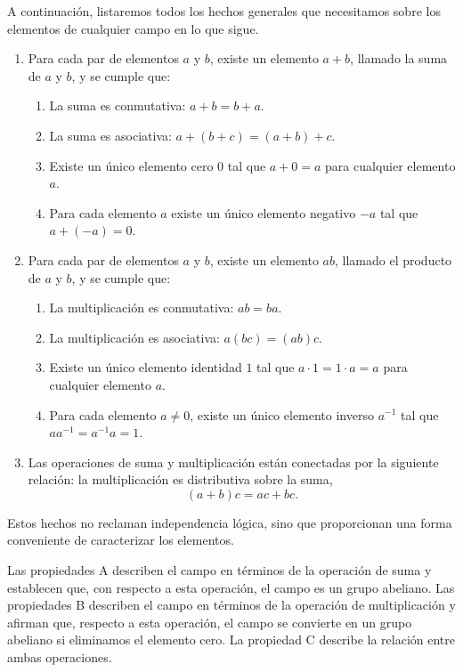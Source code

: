 A continuación, listaremos todos los hechos generales que necesitamos sobre los elementos de cualquier campo en lo que sigue.
\begin{enumerate}[label=\Alph*.]
    \item Para cada par de elementos $a$ y $b$, existe un elemento $a + b$, llamado la suma de $a$ y $b$, y se cumple que:
    \begin{enumerate}[label=\arabic*.]
        \item La suma es conmutativa: $a + b = b + a$.
        \item La suma es asociativa: $a + (b + c) = (a + b) + c$.
        \item Existe un único elemento cero $0$ tal que $a + 0 = a$ para cualquier elemento $a$.
        \item Para cada elemento $a$ existe un único elemento negativo $-a$ tal que $a + (-a) = 0$.
    \end{enumerate}
    \item Para cada par de elementos $a$ y $b$, existe un elemento $ab$, llamado el producto de $a$ y $b$, y se cumple que:
    \begin{enumerate}[label=\arabic*.]
        \item La multiplicación es conmutativa: $ab = ba$.
        \item La multiplicación es asociativa: $a (bc) = (ab) c$.
        \item Existe un único elemento identidad $1$ tal que $a \cdot 1 = 1 \cdot a = a$ para cualquier elemento $a$.
        \item Para cada elemento $a \neq 0$, existe un único elemento inverso $a^{-1}$ tal que $aa^{-1} = a^{-1}a = 1$.
    \end{enumerate}
    \item Las operaciones de suma y multiplicación están conectadas por la siguiente relación: la multiplicación es distributiva sobre la suma,
    $$(a + b) c = ac + bc.$$
\end{enumerate}
Estos hechos no reclaman independencia lógica, sino que proporcionan una forma conveniente de caracterizar los elementos.

Las propiedades A describen el campo en términos de la operación de suma y establecen que, con respecto a esta operación, el campo es un grupo abeliano. Las propiedades B describen el campo en términos de la operación de multiplicación y afirman que, respecto a esta operación, el campo se convierte en un grupo abeliano si eliminamos el elemento cero. La propiedad C describe la relación entre ambas operaciones.

